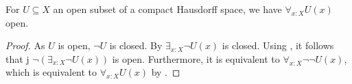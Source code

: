 

\begin{corollary}\label{AllOpenSubspaceOpen}
  For $U\subseteq X$ an open subset of a compact Hausdorff space, we have 
  $\forall_{x:X} U(x)$ open. 
\end{corollary}
\begin{proof}
  As $U$ is open, $\neg U$ is closed. 
  By  $\exists_{x:X} \neg U(x)$ is closed. 
  Using , it follows that j
  $\neg (\exists_{x:X} \neg U(x))$ is open. 
  Furthermore, it is equivalent to $\forall_{x:X} \neg \neg U(x)$, 
  which is equivalent to $\forall_{x:X} U(x)$ by .
\end{proof}

